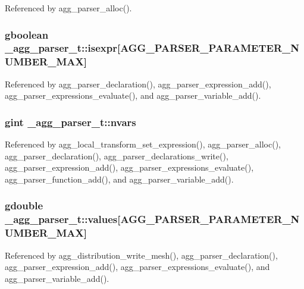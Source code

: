 Referenced by agg\+\_\+parser\+\_\+alloc().

\subsubsection[{isexpr}]{\setlength{\rightskip}{0pt plus 5cm}gboolean \+\_\+agg\+\_\+parser\+\_\+t\+::isexpr[{\bf A\+G\+G\+\_\+\+P\+A\+R\+S\+E\+R\+\_\+\+P\+A\+R\+A\+M\+E\+T\+E\+R\+\_\+\+N\+U\+M\+B\+E\+R\+\_\+\+M\+A\+X}]}\label{struct__agg__parser__t_acbaa1b0ca6d0119abbc63aaeced50e19}


Referenced by agg\+\_\+parser\+\_\+declaration(), agg\+\_\+parser\+\_\+expression\+\_\+add(), agg\+\_\+parser\+\_\+expressions\+\_\+evaluate(), and agg\+\_\+parser\+\_\+variable\+\_\+add().

\subsubsection[{nvars}]{\setlength{\rightskip}{0pt plus 5cm}gint \+\_\+agg\+\_\+parser\+\_\+t\+::nvars}\label{struct__agg__parser__t_a489056e30b70241eed78398f94e20b43}


Referenced by agg\+\_\+local\+\_\+transform\+\_\+set\+\_\+expression(), agg\+\_\+parser\+\_\+alloc(), agg\+\_\+parser\+\_\+declaration(), agg\+\_\+parser\+\_\+declarations\+\_\+write(), agg\+\_\+parser\+\_\+expression\+\_\+add(), agg\+\_\+parser\+\_\+expressions\+\_\+evaluate(), agg\+\_\+parser\+\_\+function\+\_\+add(), and agg\+\_\+parser\+\_\+variable\+\_\+add().

\subsubsection[{values}]{\setlength{\rightskip}{0pt plus 5cm}gdouble \+\_\+agg\+\_\+parser\+\_\+t\+::values[{\bf A\+G\+G\+\_\+\+P\+A\+R\+S\+E\+R\+\_\+\+P\+A\+R\+A\+M\+E\+T\+E\+R\+\_\+\+N\+U\+M\+B\+E\+R\+\_\+\+M\+A\+X}]}\label{struct__agg__parser__t_a08322b85b89b7e6f61797631a887ed07}


Referenced by agg\+\_\+distribution\+\_\+write\+\_\+mesh(), agg\+\_\+parser\+\_\+declaration(), agg\+\_\+parser\+\_\+expression\+\_\+add(), agg\+\_\+parser\+\_\+expressions\+\_\+evaluate(), and agg\+\_\+parser\+\_\+variable\+\_\+add().

